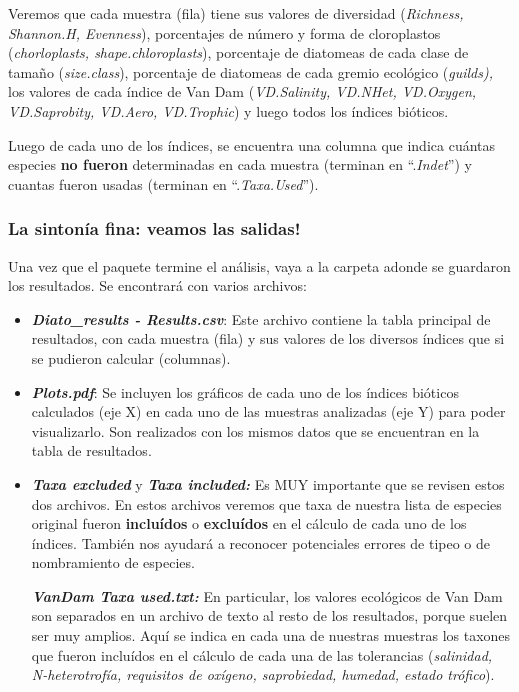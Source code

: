\documentclass[
]{book}
\begin{document}
Veremos que cada muestra (fila) tiene sus valores de diversidad (\emph{Richness, Shannon.H, Evenness}), porcentajes de número y forma de cloroplastos (\emph{chorloplasts, shape.chloroplasts}), porcentaje de diatomeas de cada clase de tamaño (\emph{size.class}), porcentaje de diatomeas de cada gremio ecológico (\emph{guilds),} los valores de cada índice de Van Dam (\emph{VD.Salinity, VD.NHet, VD.Oxygen, VD.Saprobity, VD.Aero, VD.Trophic}) y luego todos los índices bióticos.

Luego de cada uno de los índices, se encuentra una columna que indica cuántas especies \textbf{no fueron} determinadas en cada muestra (terminan en ``.\emph{Indet}'') y cuantas fueron usadas (terminan en ``.\emph{Taxa.Used}'').

\hypertarget{la-sintonuxeda-fina-veamos-las-salidas}{%
\subsubsection{\texorpdfstring{\textbf{La sintonía fina: veamos las salidas!}}{La sintonía fina: veamos las salidas!}}\label{la-sintonuxeda-fina-veamos-las-salidas}}

Una vez que el paquete termine el análisis, vaya a la carpeta adonde se guardaron los resultados. Se encontrará con varios archivos:

\begin{itemize}
\item
  \textbf{\emph{Diato\_results - Results.csv}}: Este archivo contiene la tabla principal de resultados, con cada muestra (fila) y sus valores de los diversos índices que si se pudieron calcular (columnas).
\item
  \textbf{\emph{Plots.pdf}}: Se incluyen los gráficos de cada uno de los índices bióticos calculados (eje X) en cada uno de las muestras analizadas (eje Y) para poder visualizarlo. Son realizados con los mismos datos que se encuentran en la tabla de resultados.
\item
  \textbf{\emph{Taxa excluded}} y \textbf{\emph{Taxa included:}} Es MUY importante que se revisen estos dos archivos. En estos archivos veremos que taxa de nuestra lista de especies original fueron \textbf{incluídos} o \textbf{excluídos} en el cálculo de cada uno de los índices. También nos ayudará a reconocer potenciales errores de tipeo o de nombramiento de especies.

  \textbf{\emph{VanDam Taxa used.txt:}} En particular, los valores ecológicos de Van Dam son separados en un archivo de texto al resto de los resultados, porque suelen ser muy amplios. Aquí se indica en cada una de nuestras muestras los taxones que fueron incluídos en el cálculo de cada una de las tolerancias (\emph{salinidad, N-heterotrofía, requisitos de oxígeno, saprobiedad, humedad, estado trófico}).
\end{itemize}
\end{document}
